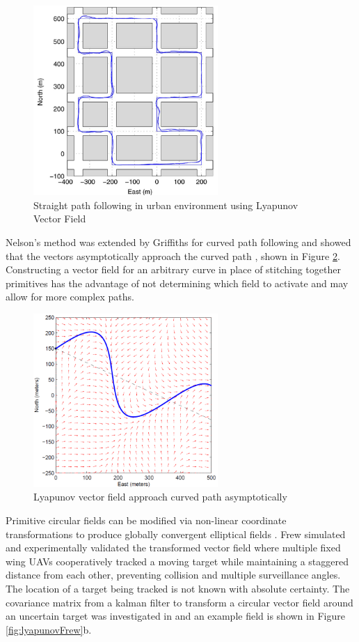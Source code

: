 \documentclass[numbered,pdftex]{ohio-etd}
\begin{document}
\begin{figure}[H]
	\centering
	\includegraphics[width=7cm]{PaperFigures/urbanFollowingNelson}
	\caption{Straight path following in urban environment \cite{nelson_cooperative_2005} using Lyapunov Vector Field}
	\label{fig:urbanfollowingnelson}
\end{figure}


Nelson's method was extended by Griffiths for curved path following and showed that the vectors asymptotically approach the curved path \cite{griffiths_vector_2006}, shown in Figure \ref{fig:griffiths}. Constructing a vector field for an arbitrary curve in place of stitching together primitives has the advantage of not determining which field to activate and may allow for more complex paths.

\begin{figure}[H]
	\centering
	\includegraphics[width=7cm]{PaperFigures/griffiths}
	\caption{Lyapunov vector field approach curved path asymptotically \cite{griffiths_vector_2006}}
	\label{fig:griffiths}
\end{figure}


Primitive circular fields can be modified via non-linear coordinate transformations to produce globally convergent elliptical fields \cite{frew_lyapunov_nodate,frew_cooperative_2007}. Frew simulated and experimentally validated the transformed vector field where multiple fixed wing UAVs cooperatively tracked a moving target while maintaining a staggered distance from each other, preventing collision and multiple surveillance angles. The location of a target being tracked is not known with absolute certainty. The covariance matrix from a kalman filter to transform a circular vector field around an uncertain target was investigated in \cite{frew_cooperative_2007} and an example field is shown in Figure \ref{fig:lyapunovFrew}b.
\end{document}
